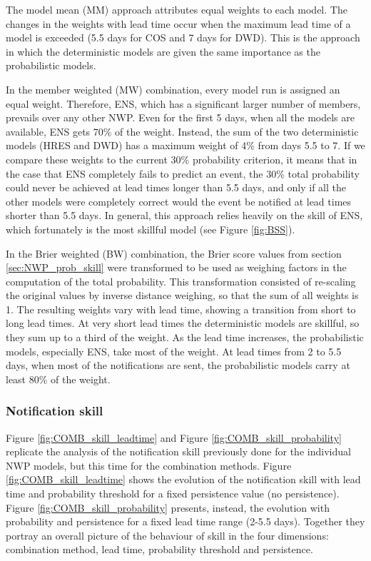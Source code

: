 \documentclass[preprint,12pt,authoryear]{elsarticle}
\begin{document}
The model mean (MM) approach attributes equal weights to each model. The changes in the weights with lead time occur when the maximum lead time of a model is exceeded (5.5 days for COS and 7 days for DWD). This is the approach in which the deterministic models are given the same importance as the probabilistic models.

In the member weighted (MW) combination, every model run is assigned an equal weight. Therefore, ENS, which has a significant larger number of members, prevails over any other NWP. Even for the first 5 days, when all the models are available, ENS gets 70\% of the weight. Instead, the sum of the two deterministic models (HRES and DWD) has a maximum weight of 4\% from days 5.5 to 7. If we compare these weights to the current 30\% probability criterion, it means that in the case that ENS completely fails to predict an event, the 30\% total probability could never be achieved at lead times longer than 5.5 days, and only if all the other models were completely correct would the event be notified at lead times shorter than 5.5 days. In general, this approach relies heavily on the skill of ENS, which fortunately is the most skillful model (see Figure \ref{fig:BSS}).

In the Brier weighted (BW) combination, the Brier score values from section \ref{sec:NWP_prob_skill} were transformed to be used as weighing factors in the computation of the total probability. This transformation consisted of re-scaling the original values by inverse distance weighing, so that the sum of all weights is 1. The resulting weights vary with lead time, showing a transition from short to long lead times. At very short lead times the deterministic models are skillful, so they sum up to a third of the weight. As the lead time increases, the probabilistic models, especially ENS, take most of the weight. At lead times from 2 to 5.5 days, when most of the notifications are sent, the probabilistic models carry at least 80\% of the weight.

\subsubsection{Notification skill}
\label{sec:COMB_skill}

Figure \ref{fig:COMB_skill_leadtime} and Figure \ref{fig:COMB_skill_probability} replicate the analysis of the notification skill previously done for the individual NWP models, but this time for the combination methods. Figure \ref{fig:COMB_skill_leadtime} shows the evolution of the notification skill with lead time and probability threshold for a fixed persistence value (no persistence). Figure \ref{fig:COMB_skill_probability} presents, instead, the evolution with probability and persistence for a fixed lead time range (2-5.5 days). Together they portray an overall picture of the behaviour of skill in the four dimensions: combination method, lead time, probability threshold and persistence.
\end{document}
